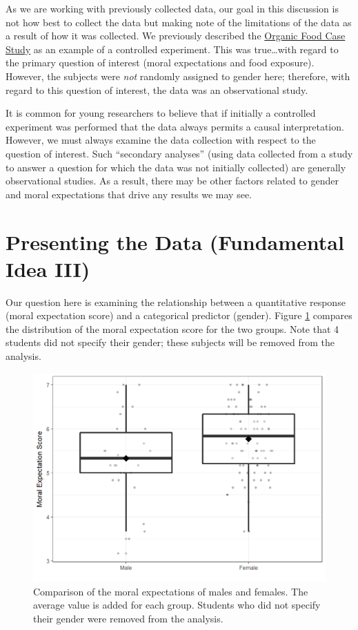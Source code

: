 \documentclass[]{book}
\theoremstyle{plain}
\theoremstyle{mydefn}
\theoremstyle{myexmpl}
\theoremstyle{remark}
\begin{document}
As we are working with previously collected data, our goal in this
discussion is not how best to collect the data but making note of the
limitations of the data as a result of how it was collected. We
previously described the \protect\hyperlink{CaseOrganic}{Organic Food
Case Study} as an example of a controlled experiment. This was
true\ldots{}with regard to the primary question of interest (moral
expectations and food exposure). However, the subjects were \emph{not}
randomly assigned to gender here; therefore, with regard to this
question of interest, the data was an observational study.

It is common for young researchers to believe that if initially a
controlled experiment was performed that the data always permits a
causal interpretation. However, we must always examine the data
collection with respect to the question of interest. Such ``secondary
analyses'' (using data collected from a study to answer a question for
which the data was not initially collected) are generally observational
studies. As a result, there may be other factors related to gender and
moral expectations that drive any results we may see.

\section{Presenting the Data (Fundamental Idea
III)}\label{presenting-the-data-fundamental-idea-iii-1}

Our question here is examining the relationship between a quantitative
response (moral expectation score) and a categorical predictor (gender).
Figure \ref{fig:anovarecap-boxplot} compares the distribution of the
moral expectation score for the two groups. Note that 4 students did not
specify their gender; these subjects will be removed from the analysis.

\begin{figure}

{\centering \includegraphics[width=0.8\linewidth]{./Images/anovarecap-boxplot-1} 

}

\caption{Comparison of the moral expectations of males and females. The average value is added for each group.  Students who did not specify their gender were removed from the analysis.}\label{fig:anovarecap-boxplot}
\end{figure}
\end{document}
